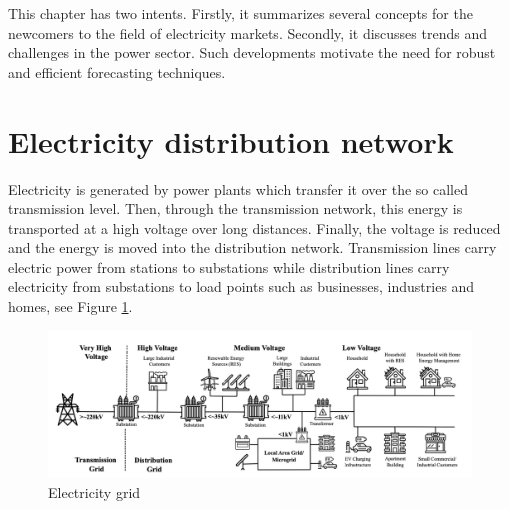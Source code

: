 
This chapter has two intents. Firstly, it summarizes several concepts for the newcomers to the field of electricity markets. Secondly, it discusses trends and challenges in the power sector. Such developments motivate the need for robust and efficient forecasting techniques.


\section{Electricity distribution network}
Electricity is generated by power plants which transfer it over the so called transmission level. Then, through the transmission network, this energy is transported at a high voltage over long distances. Finally, the voltage is reduced and the energy is moved into the distribution network. Transmission lines carry electric power from stations to substations while distribution lines carry electricity from substations to load points such as businesses, industries and homes, see Figure \ref{electricity_network}.

\begin{figure}[!h]
    \includegraphics[width=\textwidth]{images/electricity_network.png}
    \caption{Electricity grid \cite{haben2021review}}
    \label{electricity_network}
\end{figure}


